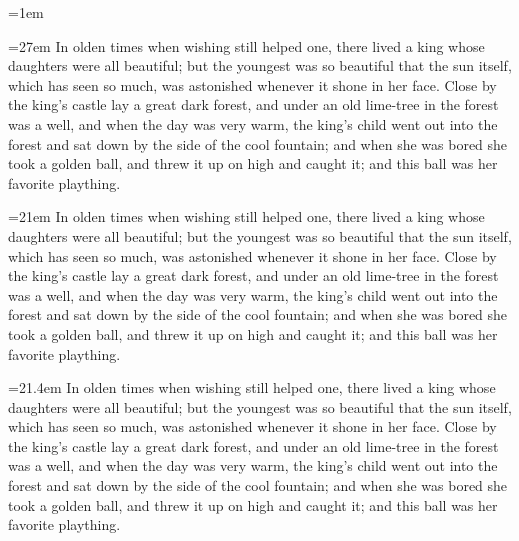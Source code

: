 % 

\showboxbreadth\maxdimen\showboxdepth\maxdimen
\parindent=1em



\hsize=27em
In olden times when wishing still helped one, there lived a king 
whose daughters were all beautiful; but the youngest was so beautiful 
that the sun itself, which has seen so much, was astonished whenever it 
shone in her face. Close by the king's castle lay a great dark forest, 
and under an old lime-tree in the forest was a well, and when the day 
was very warm, the king's child went out into the forest and sat down 
by the side of the cool fountain; and when she was bored she took a 
golden ball, and threw it up on high and caught it; and this ball was 
her favorite plaything.

\eject
\hsize=21em
In olden times when wishing still helped one, there lived a king 
whose daughters were all beautiful; but the youngest was so beautiful 
that the sun itself, which has seen so much, was astonished whenever it 
shone in her face. Close by the king's castle lay a great dark forest, 
and under an old lime-tree in the forest was a well, and when the day 
was very warm, the king's child went out into the forest and sat down 
by the side of the cool fountain; and when she was bored she took a 
golden ball, and threw it up on high and caught it; and this ball was 
her favorite plaything.

\eject
\hsize=21.4em
In olden times when wishing still helped one, there lived a king 
whose daughters were all beautiful; but the youngest was so beautiful 
that the sun itself, which has seen so much, was astonished whenever it 
shone in her face. Close by the king's castle lay a great dark forest, 
and under an old lime-tree in the forest was a well, and when the day 
was very warm, the king's child went out into the forest and sat down 
by the side of the cool fountain; and when she was bored she took a 
golden ball, and threw it up on high and caught it; and this ball was 
her favorite plaything.

\bye
